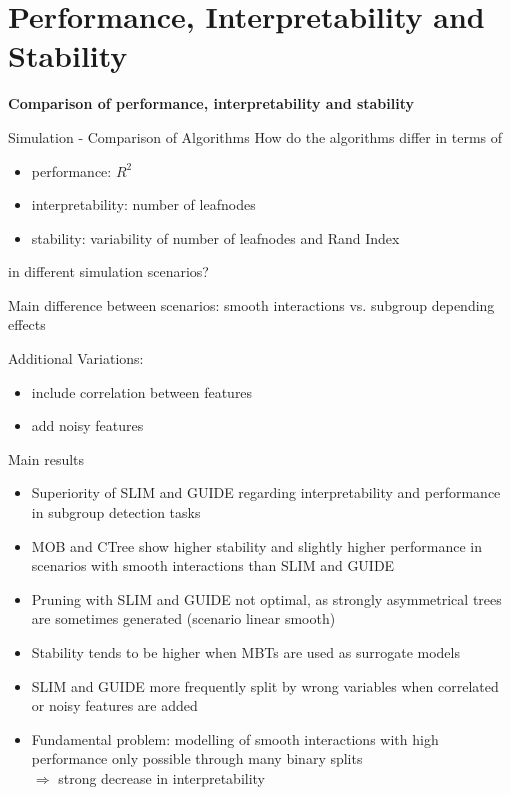 \documentclass[9pt, xcolor=table]{beamer}
\begin{document}
    

\section{Performance, Interpretability and Stability}
\begin{frame}
\centering
    \huge{\textbf{Comparison of performance, interpretability and stability}}
\end{frame}


\begin{frame}{Simulation - Comparison of Algorithms}
How do the algorithms differ in terms of
\begin{itemize}
    \item performance: $R^2$
    \item interpretability: number of leafnodes
    \item stability: variability of number of leafnodes and Rand Index
    \end{itemize}
in different simulation scenarios?

\vspace{0.3cm }
Main difference between scenarios: smooth interactions vs. subgroup depending effects

\vspace{0.5cm }
Additional Variations:
\begin{itemize}
    \item include correlation between features
    \item add noisy features
\end{itemize}

\end{frame}

\begin{frame}{Main results}
    \begin{itemize}
    \item Superiority of SLIM and GUIDE regarding interpretability and performance in subgroup detection tasks
    \item MOB and CTree show higher stability and slightly higher performance in scenarios with smooth interactions than SLIM and GUIDE 
    \item Pruning with SLIM and GUIDE not optimal, as strongly asymmetrical trees are sometimes generated (scenario linear smooth)
    \item Stability tends to be higher when MBTs are used as surrogate models
    \item SLIM and GUIDE more frequently split by wrong variables when correlated or noisy features are added
    \item Fundamental problem: modelling of smooth interactions with high performance only possible through many binary splits \\
     $\Longrightarrow$ strong decrease in interpretability 
\end{itemize}
\end{frame}
\end{document}
